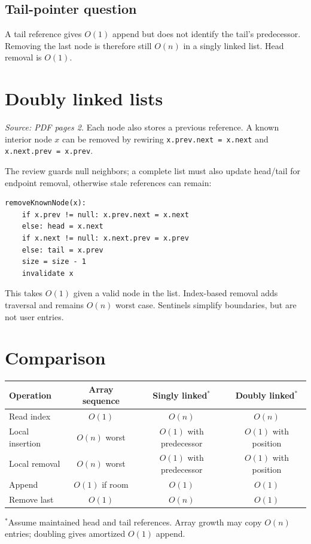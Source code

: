 \documentclass[11pt,letterpaper]{article}
\newcommand{\sourcepages}[1]{\textit{Source: PDF pages #1.}}
\newcommand{\method}[1]{\texttt{#1}}
\begin{document}
\subsection{Tail-pointer question}
A tail reference gives $O(1)$ append but does not identify the tail's predecessor. Removing the last node is therefore still $O(n)$ in a singly linked list. Head removal is $O(1)$.

\section{Doubly linked lists}
\sourcepages{2}
Each node also stores a previous reference. A known interior node $x$ can be removed by rewiring \method{x.prev.next = x.next} and \method{x.next.prev = x.prev}.

The review guards null neighbors; a complete list must also update head/tail for endpoint removal, otherwise stale references can remain:
\par\noindent\begin{minipage}{\linewidth}
\begin{lstlisting}
removeKnownNode(x):
    if x.prev != null: x.prev.next = x.next
    else: head = x.next
    if x.next != null: x.next.prev = x.prev
    else: tail = x.prev
    size = size - 1
    invalidate x
\end{lstlisting}
\end{minipage}\par
This takes $O(1)$ given a valid node in the list. Index-based removal adds traversal and remains $O(n)$ worst case. Sentinels simplify boundaries, but are not user entries.

\section{Comparison}
\begin{center}\small\begin{tabular}{@{}lccc@{}}\toprule
Operation & Array sequence & Singly linked$^*$ & Doubly linked$^*$\\\midrule
Read index & $O(1)$ & $O(n)$ & $O(n)$\\
Local insertion & $O(n)$ worst & $O(1)$ with predecessor & $O(1)$ with position\\
Local removal & $O(n)$ worst & $O(1)$ with predecessor & $O(1)$ with position\\
Append & $O(1)$ if room & $O(1)$ & $O(1)$\\
Remove last & $O(1)$ & $O(n)$ & $O(1)$\\\bottomrule
\end{tabular}\end{center}
$^*$Assume maintained head and tail references. Array growth may copy $O(n)$ entries; doubling gives amortized $O(1)$ append.
\end{document}
